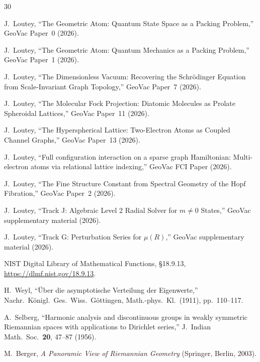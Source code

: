 \documentclass[aps,pra,twocolumn,superscriptaddress,longbibliography]{revtex4-2}
\begin{document}
\begin{thebibliography}{30}

J.~Loutey,
``The Geometric Atom: Quantum State Space as a Packing Problem,''
GeoVac Paper~0 (2026).

J.~Loutey,
``The Geometric Atom: Quantum Mechanics as a Packing Problem,''
GeoVac Paper~1 (2026).

J.~Loutey,
``The Dimensionless Vacuum: Recovering the Schr\"odinger Equation
from Scale-Invariant Graph Topology,''
GeoVac Paper~7 (2026).

J.~Loutey,
``The Molecular Fock Projection: Diatomic Molecules as Prolate
Spheroidal Lattices,''
GeoVac Paper~11 (2026).

J.~Loutey,
``The Hyperspherical Lattice: Two-Electron Atoms as Coupled
Channel Graphs,''
GeoVac Paper~13 (2026).

J.~Loutey,
``Full configuration interaction on a sparse graph Hamiltonian:
Multi-electron atoms via relational lattice indexing,''
GeoVac FCI Paper (2026).

J.~Loutey,
``The Fine Structure Constant from Spectral Geometry of the Hopf
Fibration,''
GeoVac Paper~2 (2026).

J.~Loutey,
``Track J: Algebraic Level 2 Radial Solver for $m \neq 0$ States,''
GeoVac supplementary material (2026).

J.~Loutey,
``Track G: Perturbation Series for $\mu(R)$,''
GeoVac supplementary material (2026).

NIST Digital Library of Mathematical Functions,
\S18.9.13, \url{https://dlmf.nist.gov/18.9.13}.

H.~Weyl,
``\"Uber die asymptotische Verteilung der Eigenwerte,''
Nachr.\ K\"onigl.\ Ges.\ Wiss.\ G\"ottingen, Math.-phys.\ Kl.\
(1911), pp.\ 110--117.

A.~Selberg,
``Harmonic analysis and discontinuous groups in weakly symmetric
Riemannian spaces with applications to Dirichlet series,''
J.\ Indian Math.\ Soc.\ \textbf{20}, 47--87 (1956).

M.~Berger,
\textit{A Panoramic View of Riemannian Geometry}
(Springer, Berlin, 2003).

\end{thebibliography}
\end{document}
